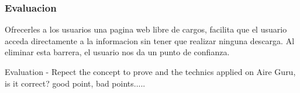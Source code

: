 \subsubsection{Evaluacion}
Ofrecerles a los usuarios una pagina web libre de cargos, facilita que el usuario acceda directamente a la informacion
sin tener que realizar ninguna descarga. Al eliminar esta barrera, el usuario nos da un punto de confianza.


Evaluation - Repect the concept to prove and the technics applied on Aire Guru, is it correct? good point, bad points.....
